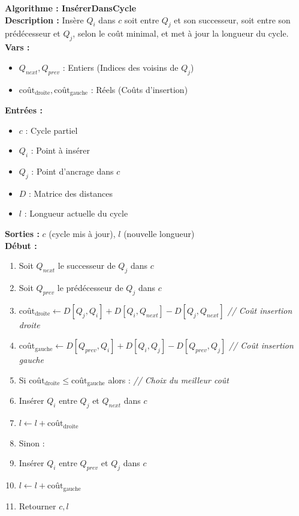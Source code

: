 \documentclass[a4paper, 12pt]{article}
\begin{document}
\vspace{5mm}

\begin{tcolorbox}[colback=darkWhite!75!white,colframe=black!30,left=5pt,right=5pt,top=5pt,bottom=5pt]
\textbf{Algorithme : InsérerDansCycle} \\
\textbf{Description :} Insère $Q_i$ dans $c$ soit entre $Q_j$ et son successeur, soit entre son prédécesseur et $Q_j$, selon le coût minimal, et met à jour la longueur du cycle. \\
\textbf{Vars :}
\begin{itemize}
    \item $Q_{next}, Q_{prev}$ : Entiers (Indices des voisins de $Q_j$)
    \item $\text{coût}_{\text{droite}}, \text{coût}_{\text{gauche}}$ : Réels (Coûts d'insertion)
\end{itemize}
\textbf{Entrées :}
\begin{itemize}
    \item $c$ : Cycle partiel
    \item $Q_i$ : Point à insérer
    \item $Q_j$ : Point d'ancrage dans $c$
    \item $D$ : Matrice des distances
    \item $l$ : Longueur actuelle du cycle
\end{itemize}
\textbf{Sorties :} $c$ (cycle mis à jour), $l$ (nouvelle longueur) \\
\textbf{Début :}
\begin{enumerate}
    \item Soit $Q_{next}$ le successeur de $Q_j$ dans $c$
    \item Soit $Q_{prev}$ le prédécesseur de $Q_j$ dans $c$
    \item $\text{coût}_{\text{droite}} \leftarrow D[Q_j, Q_i] + D[Q_i, Q_{next}] - D[Q_j, Q_{next}]$ \textit{// Coût insertion droite}
    \item $\text{coût}_{\text{gauche}} \leftarrow D[Q_{prev}, Q_i] + D[Q_i, Q_j] - D[Q_{prev}, Q_j]$ \textit{// Coût insertion gauche}
    \item Si $\text{coût}_{\text{droite}} \leq \text{coût}_{\text{gauche}}$ alors : \textit{// Choix du meilleur coût}
    \item \quad Insérer $Q_i$ entre $Q_j$ et $Q_{next}$ dans $c$
    \item \quad $l \leftarrow l + \text{coût}_{\text{droite}}$
    \item Sinon :
    \item \quad Insérer $Q_i$ entre $Q_{prev}$ et $Q_j$ dans $c$
    \item \quad $l \leftarrow l + \text{coût}_{\text{gauche}}$
    \item Retourner $c, l$
\end{enumerate}
\end{tcolorbox}
\end{document}
